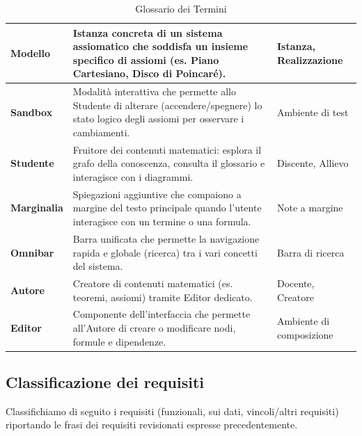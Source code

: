 \documentclass[12pt,a4paper]{article}
\begin{document}
\begin{table}[H]
\begin{tabularx}{\textwidth}{|l|X|p{3cm}|}
        \rowcolor{CodeBg} \textbf{Modello} & Istanza concreta di un sistema assiomatico che soddisfa un insieme specifico di assiomi (es. Piano Cartesiano, Disco di Poincaré). & Istanza, Realizzazione \\
        \hline
        \textbf{Sandbox} & Modalità interattiva che permette allo Studente di alterare (accendere/spegnere) lo stato logico degli assiomi per osservare i cambiamenti. & Ambiente di test \\
        \hline
        \rowcolor{CodeBg} \textbf{Studente} & Fruitore dei contenuti matematici: esplora il grafo della conoscenza, consulta il glossario e interagisce con i diagrammi. & Discente, Allievo \\
        \hline
        \textbf{Marginalia} & Spiegazioni aggiuntive che compaiono a margine del testo principale quando l'utente interagisce con un termine o una formula. & Note a margine \\
        \hline
        \textbf{Omnibar} & Barra unificata che permette la navigazione rapida e globale (ricerca) tra i vari concetti del sistema. & Barra di ricerca \\
        \hline
        \rowcolor{CodeBg} \textbf{Autore} & Creatore di contenuti matematici (es. teoremi, assiomi) tramite Editor dedicato. & Docente, Creatore \\
        \hline
        \textbf{Editor} & Componente dell'interfaccia che permette all'Autore di creare o modificare nodi, formule e dipendenze. & Ambiente di composizione \\
        \hline
    \end{tabularx}
    \caption{Glossario dei Termini}
\end{table}

\subsection{Classificazione dei requisiti}
Classifichiamo di seguito i requisiti (funzionali, sui dati, vincoli/altri requisiti) riportando le frasi dei requisiti revisionati espresse precedentemente.
\end{document}
